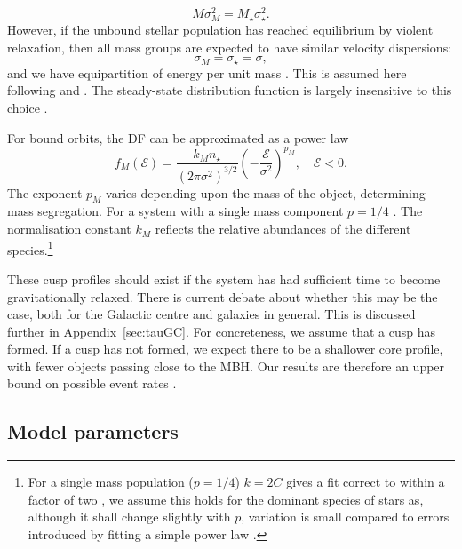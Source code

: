 \documentclass[useAMS,usedcolumn,usegraphicx,usenatbib]{mn2e}
\newcommand{\apref}[1]{Appendix~\ref{sec:#1}}
\begin{document}
\begin{equation}
M \sigma_M^2 = M_\star \sigma_\star^2.
\end{equation}
However, if the unbound stellar population has reached equilibrium by violent relaxation, then all mass groups are expected to have similar velocity dispersions:
\begin{equation}
\sigma_M = \sigma_\star = \sigma,
\end{equation}
and we have equipartition of energy per unit mass \citep{Lynden-Bell1967}. This is assumed here following \citet{Alexander2009} and \citet{O'Leary2009}. The steady-state distribution function is largely insensitive to this choice \citep{Bahcall1977, Alexander2009}.

For bound orbits, the DF can be approximated as a power law \citep{Peebles1972}
\begin{equation}
f_M(\mathcal{E}) = \frac{k_M n_\star}{(2\pi\sigma^2)^{3/2}}\left(-\frac{\mathcal{E}}{\sigma^2}\right)^{p_M},\quad\mathcal{E} < 0.
\label{eq:Bound_DF}
\end{equation}
The exponent $p_M$ varies depending upon the mass of the object, determining mass segregation. For a system with a single mass component $p = 1/4$ \citep{Bahcall1976, Young1977}. The normalisation constant $k_M$ reflects the relative abundances of the different species.\footnote{For a single mass population ($p = 1/4$) $k = 2 C$ gives a fit correct to within a factor of two \citep{Bahcall1976,Keshet2009}, we assume this holds for the dominant species of stars as, although it shall change slightly with $p$, variation is small compared to errors introduced by fitting a simple power law \citep{Hopman2006, Alexander2009}.}

These cusp profiles should exist if the system has had sufficient time to become gravitationally relaxed. There is current debate about whether this may be the case, both for the Galactic centre and galaxies in general. This is discussed further in \apref{tauGC}. For concreteness, we assume that a cusp has formed. If a cusp has not formed, we expect there to be a shallower core profile, with fewer objects passing close to the MBH. Our results are therefore an upper bound on possible event rates \citep{Merritt2010a,Gualandris2012}. 

\subsection{Model parameters}\label{sec:GC-Param}
\end{document}
